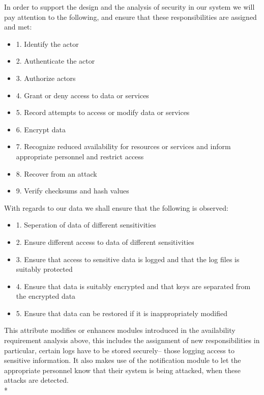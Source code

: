 \documentclass[11pt]{article}
\begin{document}
In order to support the design and the analysis of security in our system we will pay attention to the following, and ensure that these responsibilities are assigned and met:
\begin{itemize}
	\item[] 1. Identify the actor
	\item[] 2. Authenticate the actor
	\item[] 3. Authorize actors
	\item[] 4. Grant or deny access to data or services
	\item[] 5. Record attempts to access or modify data or services
	\item[] 6. Encrypt data
	\item[] 7. Recognize reduced availability for resources or services and inform appropriate personnel and restrict access
	\item[] 8. Recover from an attack
	\item[] 9. Verify checksums and hash values
\end{itemize}
 With regards to our data we shall ensure that the following is observed:
\begin{itemize}
	\item[] 1. Seperation of data of different sensitivities
	\item[] 2. Ensure different access to data of different sensitivities
	\item[] 3. Ensure that access to sensitive data is logged and that the log files is suitably protected
	\item[] 4. Ensure that data is suitably encrypted and that keys are separated from the encrypted data
	\item[] 5. Ensure that data can be restored if it is inappropriately modified
\end{itemize}

This attribute modifies or enhances modules introduced in the availability requirement analysis above, this includes the assignment of new responsibilities in particular, certain logs have to be stored securely-- those logging access to sensitive information. It also makes use of the notification module to let the appropriate personnel know that their system is being attacked, when these attacks are detected.\\*
\end{document}

